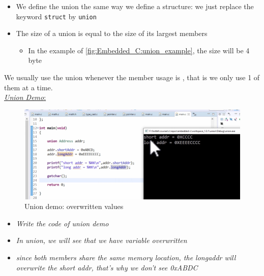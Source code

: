 \begin{itemize}
    \item We define the union the same way we define a structure: we just replace the keyword \verb|struct| by \verb|union|
    
    \item The size of a union is equal to the size of its largest members
    
    \begin{itemize}
        \item In the example of \autoref{fig:Embedded_C:union_example}, the size will be 4 byte
    \end{itemize}

\end{itemize}

We usually use the union whenever the member usage is , that is we only use 1 of them at a time.\\

 \underline{\textit{Union Demo}:} 

\begin{figure}[h]
\centering
\includegraphics[scale=0.7]{Figures/Embedded_C/union_demo_overwritten}
\caption{Union demo: overwritten values}
\label{fig:Embedded_C:union_demo_overwritten}
\end{figure}

\begin{itemize}
    \item \textit{Write the code of union demo} 
    
    \item \textit{In union, we will see that we have variable overwritten}
    
    \item \textit{since both members share the same memory location, the longaddr will overwrite the short addr, that's why we don't see 0xABDC}
\end{itemize}


